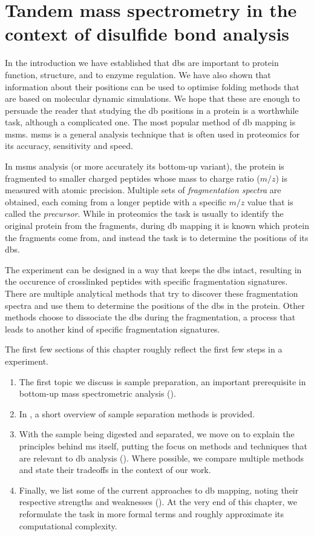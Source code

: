 \chapter{Tandem mass spectrometry in the context of disulfide bond analysis}

In the introduction we have established that \glspl*{db} are important to protein function, structure, and to enzyme regulation. We have also shown that information about their positions can be used to optimise folding methods that are based on molecular dynamic simulations. We hope that these are enough to persuade the reader that studying the \gls*{db} positions in a protein is a worthwhile task, although a complicated one. The most popular method of \gls*{db} mapping is \gls*{msms}. \gls*{msms} is a general analysis technique that is often used in proteomics for its accuracy, sensitivity and speed.~\cite{gorman2002protein}

In \gls*{msms} analysis (or more accurately its bottom-up variant), the protein is fragmented to smaller charged peptides whose mass to charge ratio (\(m/z\)) is measured with atomic precision. Multiple sets of \emph{fragmentation spectra} are obtained, each coming from a longer peptide with a specific \(m/z\) value that is called the \emph{precursor}. While in proteomics the task is usually to identify the original protein from the fragments, during \gls*{db} mapping it is known which protein the fragments come from, and instead the task is to determine the positions of its \glspl*{db}.

The experiment can be designed in a way that keeps the \glspl*{db} intact, resulting in the occurence of crosslinked peptides with specific fragmentation signatures. There are multiple analytical methods that try to discover these fragmentation spectra and use them to determine the positions of the \glspl*{db} in the protein. Other methods choose to dissociate the \glspl*{db} during the fragmentation, a process that leads to another kind of specific fragmentation signatures.

The first few sections of this chapter roughly reflect the first few steps in a  experiment.

\begin{enumerate}
  \item The first topic we discuss is sample preparation, an important prerequisite in bottom-up mass spectrometric analysis ().
  \item In , a short overview of sample separation methods is provided.
  \item With the sample being digested and separated, we move on to explain the principles behind \gls*{ms} itself, putting the focus on methods and techniques that are relevant to \gls*{db} analysis (). Where possible, we compare multiple methods and state their tradeoffs in the context of our work.
  \item Finally, we list some of the current approaches to \gls*{db} mapping, noting their respective strengths and weaknesses (). At the very end of this chapter, we reformulate the task in more formal terms and roughly approximate its computational complexity.
\end{enumerate}

